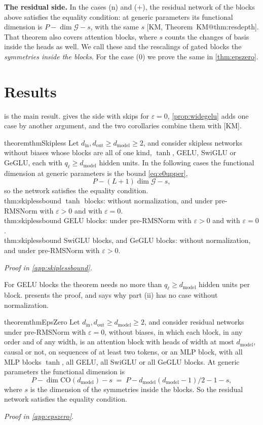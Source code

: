 \documentclass[10pt]{article}
\makeatletter
\theoremstyle{definition}
\theoremstyle{remark}
\newcommand{\dm}{d_{\mathrm{model}}}
\newcommand{\CO}{\mathrm{CO}}
\newcommand{\G}{\mathcal{G}}
\newcommand{\para}[1]{\smallskip\noindent\textbf{#1}\hspace{0.5em}}
\newcommand{\ptlabel}[1]{\phantomsection\label{#1}}
\newcommand{\proofin}[1]{\par\vspace{-0.4\baselineskip}\noindent\hfill{\small\itshape Proof in \cref{#1}.}\par\smallskip}
\newcommand{\stpart}[3]{\ifx\relax#1\relax\else\ptlabel{#1:#2}\fi{\upshape\bfseries\boldmath(#2)\ifx\relax#3\relax\else\ #3.\fi}}
\newcommand{\KMn}[1]{\csname KM@#1\endcsname}
\newcommand{\KM}[2]{[KM, #1~\KMn{#2}]}
\makeatother
\begin{document}
\para{The residual side.} In the cases (n) and (+), the residual network of the blocks above satisfies the equality condition: at generic parameters its functional dimension is $P - \dim\G - s$, with the same $s$ \KM{Theorem}{thm:resdepth}. That theorem also covers attention blocks, where $s$ counts the changes of basis inside the heads as well. We call these and the rescalings of gated blocks the \emph{symmetries inside the blocks}. For the case (0) we prove the same in \cref{thm:epszero}.

\section{Results}\label{sec:results}

 is the main result.  gives the side with skips for $\varepsilon = 0$, \cref{prop:widegelu} adds one case by another argument, and the two corollaries combine them with [KM].

\begin{restatable}{theorem}{thmSkipless}\label{thm:skiplessbound}\label{thm:epszeroskipless}
Let $d_{\mathrm{in}}, d_{\mathrm{out}} \ge \dm \ge 2$, and consider skipless networks without biases whose blocks are all of one kind, $\tanh$, GELU, SwiGLU or GeGLU, each with $q_\ell \ge \dm$ hidden units. In the following cases the functional dimension at generic parameters is the bound \eqref{eq:e0upper},
\[
P - (L+1)\dim\G - s ,
\]
so the network satisfies the equality condition.\\
\stpart{thm:skiplessbound}{i}{} $\tanh$ blocks: without normalization, and under pre-RMSNorm with $\varepsilon > 0$ and with $\varepsilon = 0$.\\
\stpart{thm:skiplessbound}{ii}{} GELU blocks: under pre-RMSNorm with $\varepsilon > 0$ and with $\varepsilon = 0$.\\
\stpart{thm:skiplessbound}{iii}{} SwiGLU blocks, and GeGLU blocks: without normalization, and under pre-RMSNorm with $\varepsilon > 0$.
\end{restatable}
\proofin{app:skiplessbound}

For GELU blocks the theorem needs no more than $q_\ell \ge \dm$ hidden units per block.  presents the proof, and says why part (ii) has no case without normalization.

\begin{restatable}[Residual networks under RMSNorm with $\varepsilon = 0$]{theorem}{thmEpsZero}\label{thm:epszero}
Let $d_{\mathrm{in}}, d_{\mathrm{out}} \ge \dm \ge 2$, and consider residual networks under pre-RMSNorm with $\varepsilon = 0$, without biases, in which each block, in any order and of any width, is an attention block with heads of width at most $\dm$, causal or not, on sequences of at least two tokens, or an MLP block, with all MLP blocks $\tanh$, all GELU, all SwiGLU or all GeGLU blocks. At generic parameters the functional dimension is
\[
P - \dim\CO(\dm) - s \;=\; P - \dm(\dm-1)/2 - 1 - s ,
\]
where $s$ is the dimension of the symmetries inside the blocks. So the residual network satisfies the equality condition.
\end{restatable}
\proofin{app:epszero}
\end{document}
